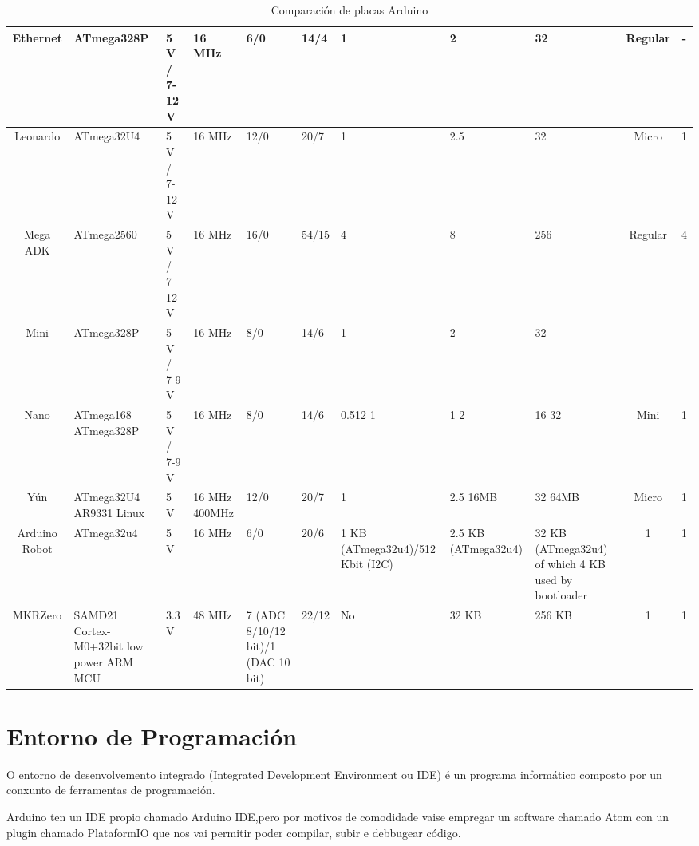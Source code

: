 \documentclass[11pt,twoside]{book}
\begin{document}
\begin{table}[htb]
\begin{center}
{\begin{tabular}{|c|m{3cm}|m{3.5cm}|m{2cm}|m{2cm}|m{2cm}|m{2cm}|m{2cm}|m{2cm}|c|c|}
\hline
Ethernet & ATmega328P & 5 V / 7-12 V & 16 MHz & 6/0 & 14/4 & 1 & 2 & 32 & Regular & - \\
\hline
Leonardo & ATmega32U4 & 5 V / 7-12 V & 16 MHz & 12/0 & 20/7 & 1 & 2.5 & 32 & Micro & 1 \\
\hline
Mega ADK & ATmega2560 & 5 V / 7-12 V & 16 MHz & 16/0 & 54/15 & 4 & 8 & 256 & Regular & 4 \\
\hline
Mini & ATmega328P & 5 V / 7-9 V & 16 MHz & 8/0 & 14/6 & 1 & 2 & 32 & - & - \\
\hline
Nano & ATmega168 \newline ATmega328P & 5 V / 7-9 V & 16 MHz & 8/0 & 14/6 & 0.512  1 & 1  2 & 16 32 & Mini & 1 \\
\hline
Yún & ATmega32U4 \newline AR9331 Linux & 5 V & 16 MHz \newline 400MHz & 12/0 & 20/7 & 1 & 2.5 \newline  16MB & 32 \newline   64MB & Micro & 1 \\
\hline
Arduino Robot & ATmega32u4 & 5 V & 16 MHz & 6/0 & 20/6 & 1 KB (ATmega32u4)/512 Kbit (I2C) & 2.5 KB (ATmega32u4) & 32 KB (ATmega32u4) of which 4 KB used by bootloader & 1 & 1 \\
\hline
MKRZero & SAMD21 \newline  Cortex-M0+32bit low power \newline ARM MCU & 3.3 V & 48 MHz & 7 (ADC 8/10/12 bit)/1 (DAC 10 bit) & 22/12 & No & 32 KB & 256 KB & 1 & 1 \\
\hline
\end{tabular}
}
\caption{Comparación de placas Arduino}
\label{taboa:comparacion}
\end{center}
\end{table}

\section{Entorno de Programación}

O entorno de desenvolvemento integrado (Integrated Development Environment ou IDE) é un programa informático composto por un conxunto de ferramentas de programación. 

Arduino ten un IDE propio chamado Arduino IDE,pero por motivos de comodidade vaise empregar un software chamado Atom con un plugin chamado PlataformIO que nos vai permitir poder compilar, subir e debbugear código.
\end{document}
